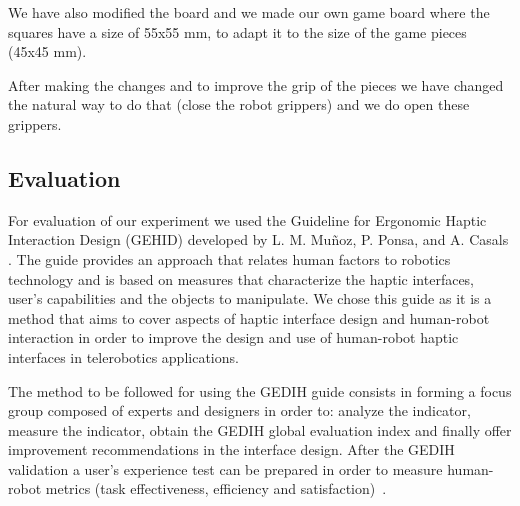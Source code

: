 \documentclass[journal,twoside]{JoPhA}
\begin{document}
We have also modified the board and we made our own game board where the squares have a size of 55x55 mm, to adapt it to the size of the game pieces (45x45 mm).

After making the changes and to improve the grip of the pieces we have changed the natural way to do that (close the robot grippers) and we do open these grippers.


\subsection{Evaluation}

For evaluation of our experiment we used the Guideline for Ergonomic Haptic Interaction Design (GEHID) developed by L. M. Muñoz, P. Ponsa, and A. Casals \cite{Munoz12}. The guide provides an approach that relates human factors to robotics technology and is based on measures that characterize the haptic interfaces, user’s capabilities and the objects to manipulate. We chose this guide as it is a method that aims to cover aspects of haptic interface design and human-robot interaction in order to improve the design and use of human-robot haptic interfaces in telerobotics applications.

The method to be followed for using the GEDIH guide consists in forming a focus group composed of experts and designers in order to: analyze the indicator, measure the indicator, obtain the GEDIH global evaluation index and finally offer improvement recommendations in the interface design. After the GEDIH validation a user’s experience test can be prepared in order to measure human-robot metrics (task effectiveness, efficiency and satisfaction)~\cite{Andonovski10}.
\end{document}
